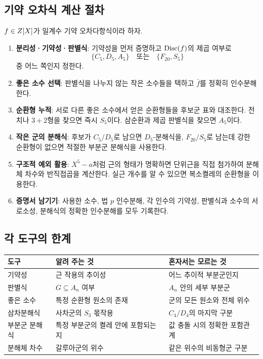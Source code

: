 \subsection{기약 오차식 계산 절차}

$f\in Z[X]$가 일계수 기약 오차다항식이라 하자.

\begin{enumerate}
  \item \textbf{분리성·기약성·판별식}: 기약성을 먼저 증명하고 $\operatorname{Disc}(f)$의 제곱 여부로
  \[
    \{C_5,D_5,A_5\}
    \quad\text{또는}\quad
    \{F_{20},S_5\}
  \]
  중 어느 쪽인지 정한다.
  \item \textbf{좋은 소수 선택}: 판별식을 나누지 않는 작은 소수들을 택하고 $\bar f$를 정확히 인수분해한다.
  \item \textbf{순환형 누적}: 서로 다른 좋은 소수에서 얻은 순환형들을 후보군 표와 대조한다. 전치나 $3+2$형을 찾으면 즉시 $S_5$이다. 삼순환과 제곱 판별식을 찾으면 $A_5$이다.
  \item \textbf{작은 군의 분해식}: 후보가 $C_5/D_5$로 남으면 $D_5$-분해식을, $F_{20}/S_5$로 남는데 강한 순환형이 없으면 적절한 부분군 분해식을 사용한다.
  \item \textbf{구조적 예외 활용}: $X^5-a$처럼 근의 형태가 명확하면 단위근을 직접 첨가하여 분해체 차수와 반직접곱을 계산한다. 실근 개수를 알 수 있으면 복소켤레의 순환형을 이용한다.
  \item \textbf{증명서 남기기}: 사용한 소수, 법 $p$ 인수분해, 각 인수의 기약성, 판별식과 소수의 서로소성, 분해식의 정확한 인수분해를 모두 기록한다.
\end{enumerate}

\subsection{각 도구의 한계}

\begin{center}
\renewcommand{\arraystretch}{1.22}
\begin{tabular}{p{}p{}p{}}
\toprule
도구 & 알려 주는 것 & 혼자서는 모르는 것 \\
\midrule
기약성 & 근 작용의 추이성 & 어느 추이적 부분군인지 \\
판별식 & $G\subseteq A_n$ 여부 & $A_n$ 안의 세부 부분군 \\
좋은 소수 & 특정 순환형 원소의 존재 & 군의 모든 원소와 전체 위수 \\
삼차분해식 & 사차군의 $S_3$ 몫작용 & $C_4/D_4$의 마지막 구분 \\
부분군 분해식 & 특정 부분군의 켤레 안에 포함되는지 & 값 충돌 시의 정확한 포함관계 \\
분해체 차수 & 갈루아군의 위수 & 같은 위수의 비동형군 구분 \\
\bottomrule
\end{tabular}
\end{center}

